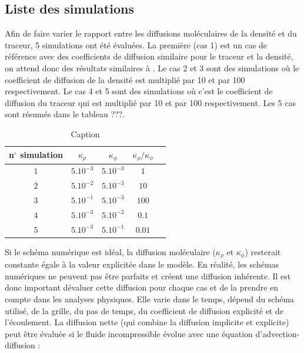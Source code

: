 \documentclass[a4paper,12pt]{article}
\begin{document}
    \subsection{Liste des simulations}
    Afin de faire varier le rapport entre les diffusions moléculaires de la densité et du traceur, 5 simulations ont été évaluées. La première (cas 1) est un cas de référence avec des coefficients de diffusion similaire pour le traceur et la densité, on attend donc des résultats similaires à \cite{penney_diapycnal_2020}. Le cas 2 et 3 sont des simulations où le coefficient de diffusion de la densité est  multiplié par 10 et par 100 respectivement. Le cas 4 et 5 sont des simulations où c'est le coefficient de diffusion du traceur qui est multiplié par 10 et par 100 respectivement. Les 5 cas sont résumés dans le tableau ???.
    \begin{center}
    \begin{table}[h]
        \centering
        \renewcommand{\arraystretch}{1.5} %
        \setlength{\tabcolsep}{0.5cm} %
        \begin{tabular}{|c|c|c|c|c|}
        \hline
         n$^\circ$ simulation & $\kappa_{\rho}$ & $\kappa_{\phi}$ & $\kappa_{\rho}/\kappa_{\phi}$ \\ \hline
         $1$ & $5.10^{-3}$ & $5.10^{-3}$ & $1$\\
         \hline
         $2$ & $5.10^{-2}$ & $5.10^{-3}$ & $10$ \\
         \hline
         $3$ & $5.10^{-1}$ & $5.10^{-3}$ & $100$\\
         \hline
         $4$ & $5.10^{-3}$ & $5.10^{-2}$ & $0.1$\\
         \hline
         $5$ & $5.10^{-3}$ & $5.10^{-1}$ & $0.01$\\
         \hline
        \end{tabular}
        \caption{Caption}
        \label{tab:my_label}
    \end{table}
    \end{center}
    Si le schéma numérique est idéal, la diffusion moléculaire ($\kappa_{\rho}$ et $\kappa_{\phi}$) resterait constante égale à la valeur explicitée dans le modèle. En réalité, les schémas numériques ne peuvent pas être parfaits et créent une diffusion inhérente. Il est donc important dévaluer cette diffusion pour chaque cas et de la prendre en compte dans les analyses physiques. Elle varie dans le temps, dépend du schéma utilisé, de la grille, du pas de temps, du coefficient de diffusion explicité et de l'écoulement. La diffusion nette (qui combine la diffusion implicite et explicite) peut être évaluée si le fluide incompressible évolue avec une équation d'advection-diffusion :
\end{document}
